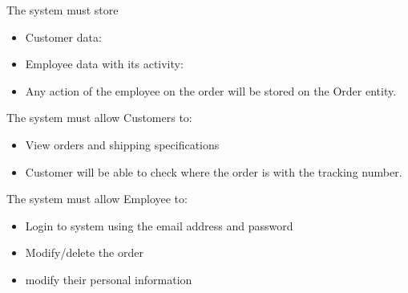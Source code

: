 The system must store
\begin{itemize}
	\item Customer data:
\end{itemize}
\begin{itemize}
	\item Employee data with its activity:
	\item Any action of the employee on the order will be stored on the Order entity.
\end{itemize}

The system must allow Customers to:
\begin{itemize}
	\item View orders and shipping specifications
	\item Customer will be able to check where the order is with the tracking number.
\end{itemize}

The system must allow Employee to:
\begin{itemize}
	\item Login to system using the email address and password
	\item Modify/delete the order
	\item modify their personal information
\end{itemize}
